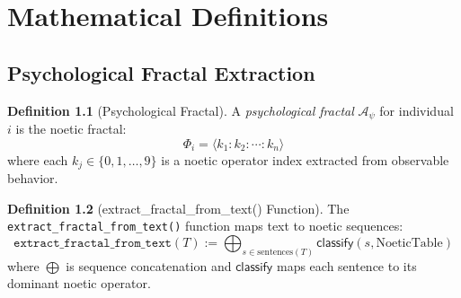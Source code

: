 \documentclass[11pt,twoside]{book}
\theoremstyle{definition}
\newtheorem{definition}{Definition}[chapter]
\theoremstyle{plain}
\theoremstyle{remark}
\newcommand{\Frac}{\Phi}
\newcommand{\PsychAttractor}{\mathcal{A}_\psi}
\begin{document}
\chapter{Mathematical Definitions}
\label{ch:psych-definitions}

\section{Psychological Fractal Extraction}

\begin{definition}[Psychological Fractal]
\label{def:psych-fractal}
A \emph{psychological fractal} $\PsychAttractor$ for individual $i$ is the noetic fractal:
\[
    \Frac_i = \langle k_1 : k_2 : \cdots : k_n \rangle
\]
where each $k_j \in \{0, 1, \ldots, 9\}$ is a noetic operator index extracted from observable behavior.
\end{definition}

\begin{definition}[extract\_fractal\_from\_text() Function]
\label{def:extract-fractal-text}
The \texttt{extract\_fractal\_from\_text()} function maps text to noetic sequences:
\[
\boxed{
    \mathtt{extract\_fractal\_from\_text}(T) := \bigoplus_{s \in \mathrm{sentences}(T)}
    \mathsf{classify}(s, \mathrm{NoeticTable})
}
\]
where $\bigoplus$ is sequence concatenation and $\mathsf{classify}$ maps each sentence to its dominant noetic operator.
\end{definition}
\end{document}
